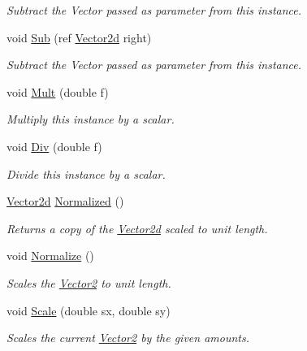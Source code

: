 \begin{DoxyCompactItemize}
\begin{DoxyCompactList}\small\item\em Subtract the Vector passed as parameter from this instance.\end{DoxyCompactList}\item 
void \hyperlink{struct_open_t_k_1_1_vector2d_a7434fda20de398c11d44733632c0c11b}{Sub} (ref \hyperlink{struct_open_t_k_1_1_vector2d}{Vector2d} right)
\begin{DoxyCompactList}\small\item\em Subtract the Vector passed as parameter from this instance.\end{DoxyCompactList}\item 
void \hyperlink{struct_open_t_k_1_1_vector2d_a5db83f4f71416f7071600ef409489468}{Mult} (double f)
\begin{DoxyCompactList}\small\item\em Multiply this instance by a scalar.\end{DoxyCompactList}\item 
void \hyperlink{struct_open_t_k_1_1_vector2d_aae73c1afcfa593971e3acb1376c40648}{Div} (double f)
\begin{DoxyCompactList}\small\item\em Divide this instance by a scalar.\end{DoxyCompactList}\item 
\hyperlink{struct_open_t_k_1_1_vector2d}{Vector2d} \hyperlink{struct_open_t_k_1_1_vector2d_a23c635b67beef38dd3e6c7d2885ddad7}{Normalized} ()
\begin{DoxyCompactList}\small\item\em Returns a copy of the \hyperlink{struct_open_t_k_1_1_vector2d}{Vector2d} scaled to unit length. \end{DoxyCompactList}\item 
void \hyperlink{struct_open_t_k_1_1_vector2d_af272c675141ac462c157924b5b602e10}{Normalize} ()
\begin{DoxyCompactList}\small\item\em Scales the \hyperlink{struct_open_t_k_1_1_vector2}{Vector2} to unit length. \end{DoxyCompactList}\item 
void \hyperlink{struct_open_t_k_1_1_vector2d_a89cbe06302962e5fc919265186bc1ce1}{Scale} (double sx, double sy)
\begin{DoxyCompactList}\small\item\em Scales the current \hyperlink{struct_open_t_k_1_1_vector2}{Vector2} by the given amounts. \end{DoxyCompactList}\item 

\end{DoxyCompactItemize}
